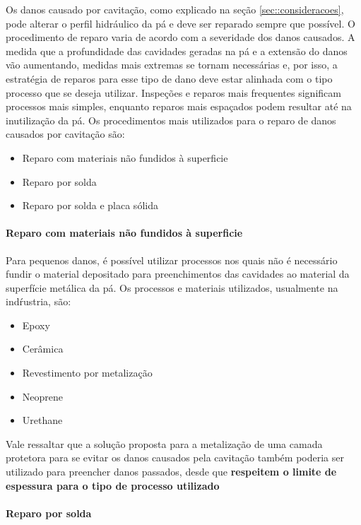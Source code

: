 Os danos causado por cavitação, como explicado na seção
\ref{sec::consideracoes}, pode alterar o perfil hidráulico da pá e deve ser
reparado sempre que possível. O procedimento de reparo varia de acordo com a
severidade dos danos causados. A medida que a profundidade das cavidades geradas
na pá e a extensão do danos vão aumentando, medidas mais extremas se tornam
necessárias e, por isso, a estratégia de reparos para esse tipo de dano deve
estar alinhada com o tipo processo que se deseja utilizar. Inspeções e reparos
mais frequentes significam processos mais simples, enquanto reparos mais
espaçados podem resultar até na inutilização da pá. Os procedimentos mais
utilizados para o reparo de danos causados por cavitação são:

\begin{itemize}
  \item Reparo com materiais não fundidos à superficie
  \item Reparo por solda
  \item Reparo por solda e placa sólida
\end{itemize}

\paragraph{Reparo com materiais não fundidos à superficie}

Para pequenos danos, é possível utilizar processos nos quais não é necessário
fundir o material depositado para preenchimentos das cavidades ao material da
superfície metálica da pá. Os processos e materiais utilizados, usualmente na
indŕustria, são: 

\begin{itemize}
\item Epoxy
\item Cerâmica
\item Revestimento por metalização
\item Neoprene
\item Urethane
\end{itemize}

Vale ressaltar que a solução proposta para a metalização de uma camada protetora
para se evitar os danos causados pela cavitação também poderia ser utilizado
para preencher danos passados, desde que \textbf{respeitem o limite de espessura
para o tipo de processo utilizado}


\paragraph{Reparo por solda}

